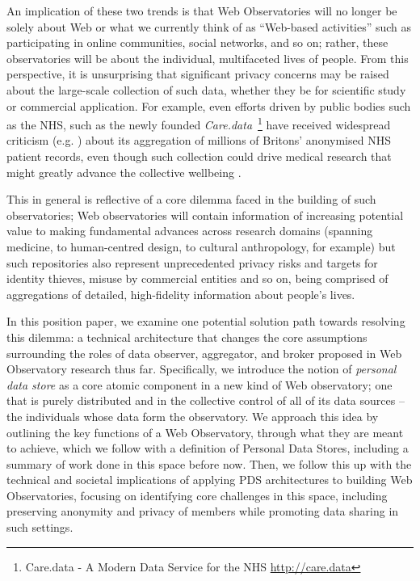 \documentclass[letterpaper]{sig-alternate}
\begin{document}
An implication of these two trends is that Web Observatories will no longer be solely about Web or what we currently think of as ``Web-based activities'' such as participating in online communities, social networks, and so on; rather, these observatories will be about the individual, multifaceted lives of people. From this perspective, it is unsurprising that significant privacy concerns may be raised about the large-scale collection of such data, whether they be for scientific study or commercial application. For example, even efforts driven by public bodies such as the NHS, such as the newly founded \emph{Care.data}~\footnote{Care.data - A Modern Data Service for the NHS \url{http://care.data}} have received widespread criticism (e.g. \cite{RameshNHS}) about its aggregation of millions of Britons' anonymised NHS patient records, even though such collection could drive medical research that might greatly advance the collective wellbeing \cite{de2006use}.

This in general is reflective of a core dilemma faced in the building of such observatories; Web observatories will contain information of increasing potential value to making fundamental advances across research domains (spanning medicine, to human-centred design, to cultural anthropology, for example) but such repositories also represent unprecedented privacy risks and targets for identity thieves, misuse by commercial entities and so on, being comprised of aggregations of detailed, high-fidelity information about people's lives. 

In this position paper, we examine one potential solution path towards resolving this dilemma: a technical architecture that changes the core assumptions surrounding the roles of data observer, aggregator, and broker proposed in Web Observatory research thus far. Specifically, we introduce the notion of \emph{personal data store} as a core atomic component in a new kind of Web observatory; one that is purely distributed and in the collective control of all of its data sources -- the individuals whose data form the observatory.  We approach this idea by outlining the key functions of a Web Observatory, through what they are meant to achieve, which we follow with a definition of Personal Data Stores, including a summary of work done in this space before now. Then, we follow this up with the technical and societal implications of applying PDS architectures to building Web Observatories, focusing on identifying core challenges in this space, including preserving anonymity and privacy of members while promoting data sharing in such settings.
\end{document}
